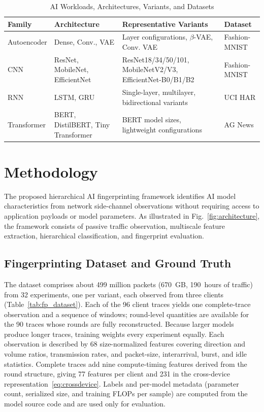 \begin{table}[!htbp]
\centering
\caption{AI Workloads, Architectures, Variants, and Datasets}
\label{tab:ai_workloads}
\scriptsize
\renewcommand{\arraystretch}{1.10}
\setlength{\tabcolsep}{2pt}
\begin{tabular}{
>{\RaggedRight\arraybackslash}p{}
>{\RaggedRight\arraybackslash}p{}
>{\RaggedRight\arraybackslash}p{}
>{\RaggedRight\arraybackslash}p{}
}
\hline
\textbf{Family} &
\textbf{Architecture} &
\textbf{Representative Variants} &
\textbf{Dataset} \\
\hline
Autoencoder &
Dense, Conv., VAE &
Layer configurations, $\beta$-VAE, Conv. VAE &
Fashion-MNIST \\
CNN &
ResNet, MobileNet, EfficientNet &
ResNet18/34/50/101, MobileNetV2/V3,
EfficientNet-B0/B1/B2 &
Fashion-MNIST \\
RNN &
LSTM, GRU &
Single-layer, multilayer,
bidirectional variants &
UCI HAR \\
Transformer &
BERT, DistilBERT, Tiny Transformer &
BERT model sizes,
lightweight configurations &
AG News \\
\hline
\end{tabular}
\end{table}

\section{Methodology}
\label{sec:methodology}
The proposed hierarchical AI fingerprinting framework identifies AI model
characteristics from network side-channel observations without requiring access
to application payloads or model parameters. As illustrated in
Fig.~\ref{fig:architecture}, the framework consists of passive traffic
observation, multiscale feature extraction, hierarchical classification, and
fingerprint evaluation.

\subsection{Fingerprinting Dataset and Ground Truth}
\label{subsec:dataset}
The dataset comprises about 499 million packets (670~GB, 190~hours of traffic)
from 32 experiments, one per variant, each observed from three clients
(Table~\ref{tab:fp_dataset}). Each of the 96 client traces yields one
complete-trace observation and a sequence of windows; round-level quantities
are available for the 90 traces whose rounds are fully reconstructed. Because
larger models produce longer traces, training weights every experiment equally.
Each observation is described by 68 size-normalized features covering direction
and volume ratios, transmission rates, and packet-size, interarrival, burst, and
idle statistics. Complete traces add nine compute-timing features derived from
the round structure, giving 77 features per client and 231 in the cross-device
representation~\eqref{eq:crossdevice}. Labels and per-model metadata (parameter
count, serialized size, and training FLOPs per sample) are computed from the
model source code and are used only for evaluation.

